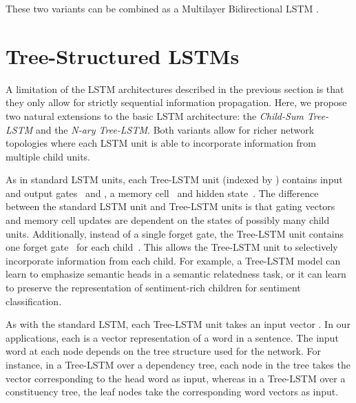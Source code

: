 \documentclass[11pt]{article}
\begin{document}
\smallskip
These two variants can be combined as a Multilayer Bidirectional LSTM \citep{graves2013hybrid}.

\section{Tree-Structured LSTMs}
\label{sec:tree-structured-lstms}

A limitation of the LSTM architectures described in the previous section is that they only allow for strictly sequential information propagation. Here, we propose two natural extensions to the basic LSTM architecture: the \emph{Child-Sum Tree-LSTM} and the \emph{N-ary Tree-LSTM}. Both variants allow for richer network topologies where each LSTM unit is able to incorporate information from multiple child units.

As in standard LSTM units, each Tree-LSTM unit (indexed by )  contains input and output gates~ and , a memory cell~ and hidden state~. The difference between the standard LSTM unit and Tree-LSTM units is that gating vectors and memory cell updates are dependent on the states of possibly many child units. Additionally, instead of a single forget gate, the Tree-LSTM unit contains one forget gate~ for each child~. This allows the Tree-LSTM unit to selectively incorporate information from each child. For example, a Tree-LSTM model can learn to emphasize semantic heads in a semantic relatedness task, or it can learn to preserve the representation of sentiment-rich children for sentiment classification.

As with the standard LSTM, each Tree-LSTM unit takes an input vector . In our applications, each  is a vector representation of a word in a sentence. The input word at each node depends on the tree structure used for the network. For instance, in a Tree-LSTM over a dependency tree, each node in the tree takes the vector corresponding to the head word as input, whereas in a Tree-LSTM over a constituency tree, the leaf nodes take the corresponding word vectors as input.
\end{document}
